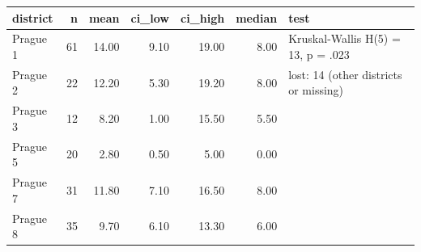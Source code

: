 \begin{tabular}{lrrrrrl}
  \toprule
district & n & mean & ci\_low & ci\_high & median & test \\ 
  \midrule
Prague 1 &  61 & 14.00 & 9.10 & 19.00 & 8.00 & Kruskal-Wallis H(5) = 13, p = .023 \\ 
  Prague 2 &  22 & 12.20 & 5.30 & 19.20 & 8.00 & lost: 14 (other districts or missing) \\ 
  Prague 3 &  12 & 8.20 & 1.00 & 15.50 & 5.50 &  \\ 
  Prague 5 &  20 & 2.80 & 0.50 & 5.00 & 0.00 &  \\ 
  Prague 7 &  31 & 11.80 & 7.10 & 16.50 & 8.00 &  \\ 
  Prague 8 &  35 & 9.70 & 6.10 & 13.30 & 6.00 &  \\ 
   \bottomrule
\end{tabular}
